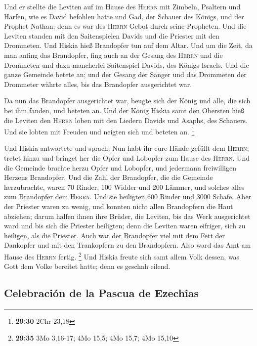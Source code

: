  Und er stellte die Leviten auf im Hause des
\textsc{Herrn} mit Zimbeln, Psaltern und Harfen, wie es David befohlen
hatte und Gad, der Schauer des Königs, und der Prophet Nathan; denn es
war des \textsc{Herrn} Gebot durch seine Propheten.  Und
die Leviten standen mit den Saitenspielen Davids und die Priester mit
den Drommeten.  Und Hiskia hieß Brandopfer tun auf dem
Altar. Und um die Zeit, da man anfing das Brandopfer, fing auch an der
Gesang des \textsc{Herrn} und die Drommeten und dazu mancherlei
Saitenspiel Davids, des Königs Israels.  Und die ganze
Gemeinde betete an; und der Gesang der Sänger und das Drommeten der
Drommeter währte alles, bis das Brandopfer ausgerichtet war.

 Da nun das Brandopfer ausgerichtet war, beugte sich der
König und alle, die sich bei ihm fanden, und beteten an. 
Und der König Hiskia samt den Obersten hieß die Leviten den
\textsc{Herrn} loben mit den Liedern Davids und Asaphs, des Schauers.
Und sie lobten mit Freuden und neigten sich und beteten an. \footnote{\textbf{29:30}
  2Chr 23,18}

 Und Hiskia antwortete und sprach: Nun habt ihr eure
Hände gefüllt dem \textsc{Herrn}; tretet hinzu und bringet her die Opfer
und Lobopfer zum Hause des \textsc{Herrn}. Und die Gemeinde brachte
herzu Opfer und Lobopfer, und jedermann freiwilligen Herzens Brandopfer.
 Und die Zahl der Brandopfer, die die Gemeinde
herzubrachte, waren 70 Rinder, 100 Widder und 200 Lämmer, und solches
alles zum Brandopfer dem \textsc{Herrn}.  Und sie
heiligten 600 Rinder und 3000 Schafe.  Aber der Priester
waren zu wenig, und konnten nicht allen Brandopfern die Haut abziehen;
darum halfen ihnen ihre Brüder, die Leviten, bis das Werk ausgerichtet
ward und bis sich die Priester heiligten; denn die Leviten waren
eifriger, sich zu heiligen, als die Priester.  Auch war
der Brandopfer viel mit dem Fett der Dankopfer und mit den Trankopfern
zu den Brandopfern. Also ward das Amt am Hause des \textsc{Herrn}
fertig. \footnote{\textbf{29:35} 3Mo 3,16-17; 4Mo 15,5; 4Mo 15,7; 4Mo
  15,10}  Und Hiskia freute sich samt allem Volk dessen,
was Gott dem Volke bereitet hatte; denn es geschah eilend.

\hypertarget{celebraciuxf3n-de-la-pascua-de-ezechuxeeas}{%
\subsection{Celebración de la Pascua de
Ezechîas}\label{celebraciuxf3n-de-la-pascua-de-ezechuxeeas}}

